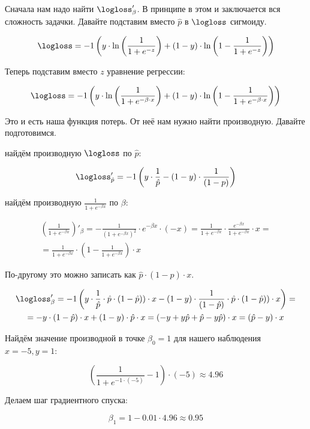 \begin{sol}
Сначала нам надо найти $\logloss'_{\beta}$. В принципе в этом и заключается вся сложность задачки. Давайте подставим вместо $\hat p $ в $\logloss$ сигмоиду. 

$$
\logloss = -1 \left (y \cdot \ln \left( \frac{1}{1 + e^{-z}} \right)  + (1 - y) \cdot \ln \left ( 1 - \frac{1}{1 + e^{-z}} \right ) \right)
$$
	
Теперь подставим вместо $z$ уравнение регрессии:
	

$$
\logloss = -1 \left (y \cdot \ln \left( \frac{1}{1 + e^{-\beta \cdot x}} \right)  + (1 - y) \cdot \ln \left ( 1 - \frac{1}{1 + e^{- \beta \cdot x}} \right ) \right)
$$

Это и есть наша функция потерь.  От неё нам нужно найти производную. Давайте подготовимся. 

 найдём производную $\logloss$ по $\hat p$: 

$$
\logloss'_{\hat p} = -1 \left(y \cdot \frac{1}{\hat p} - (1 - y) \cdot \frac{1}{(1 - p)} \right)
$$

 найдём производную $\frac{1}{1 + e^{-\beta x}} $ по $\beta$: 

\begin{multline*}
\left(  \frac{1}{1 + e^{-\beta x}}   \right)'_{\beta}  = - \frac{1}{(1 + e^{-\beta x})^2} \cdot e^{-\beta x} \cdot (-x) =\frac{1}{1 + e^{-\beta x}}  \cdot \frac{e^{-\beta x}}{1 + e^{-\beta x}} \cdot x  = \\ = \frac{1}{1 + e^{-\beta x}}  \cdot  \left(1 - \frac{1}{1 + e^{-\beta x}}  \right) \cdot x
\end{multline*}

По-другому это можно записать как $\hat p \cdot (1 - \hat p) \cdot x$.  


\begin{multline*}
\logloss'_{\beta} = -1 \left(y \cdot \frac{1}{\hat p}  \cdot  \hat p \cdot  \left(1 - \hat p)  \right) \cdot x  - (1 - y) \cdot \frac{1}{(1 - \hat p)} \cdot  \hat p \cdot  \left(1 - \hat p)  \right) \cdot x \right) = \\ =  -y \cdot \left( 1 - \hat p \right) \cdot x + (1 - y) \cdot  \hat p  \cdot x =  (-y + y \hat p  + \hat p - y \hat p ) \cdot x = (\hat p - y) \cdot x
\end{multline*}
	
Найдём значение производной в точке $\beta_0 = 1$ для нашего наблюдения $x = -5, y=1$: 

$$
\left(\frac{1}{1 + e^{-1 \cdot (-5)}}  - 1 \right) \cdot (-5)  \approx  4.96
$$

Делаем шаг градиентного спуска: 

$$
\beta_1 = 1 - 0.01 \cdot 4.96 \approx 0.95
$$	
\end{sol} 
